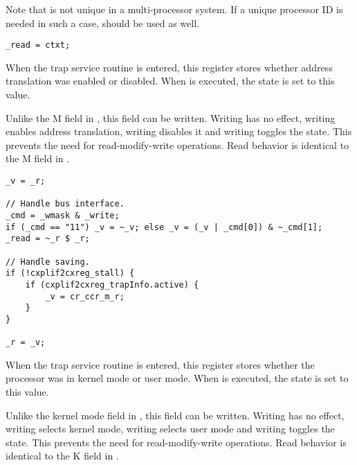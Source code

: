 Note that  is not unique in a multi-processor system. If a unique
processor ID is needed in such a case,  should be used as well.

\reset{********}
\implementation{}
\begin{lstlisting}
_read = ctxt;
\end{lstlisting}

When the trap service routine is entered, this register stores whether address 
translation was enabled or disabled. When  is executed, the state is 
set to this value.

Unlike the M field in , this field can be written. Writing  
has no effect, writing  enables address translation, writing  
disables it and writing  toggles the state. This prevents the need for 
read-modify-write operations. Read behavior is identical to the M field in 
.

\declaration{}
\implementation{}
\begin{lstlisting}
_v = _r;

// Handle bus interface.
_cmd = _wmask & _write;
if (_cmd == "11") _v = ~_v; else _v = (_v | _cmd[0]) & ~_cmd[1];
_read = ~_r $ _r;

// Handle saving.
if (!cxplif2cxreg_stall) {
    if (cxplif2cxreg_trapInfo.active) {
        _v = cr_ccr_m_r;
    }
}

_r = _v;
\end{lstlisting}

When the trap service routine is entered, this register stores whether the 
processor was in kernel mode or user mode. When  is executed, the 
state is set to this value.

Unlike the kernel mode field in , this field can be written. Writing 
 has no effect, writing  selects kernel mode, writing 
 selects user mode and writing  toggles the state. This 
prevents the need for read-modify-write operations. Read behavior is identical 
to the K field in .

